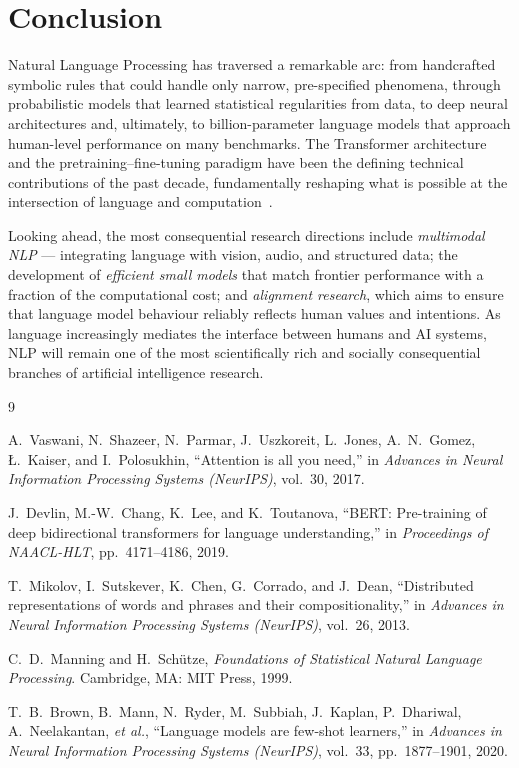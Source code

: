 \documentclass[12pt, a4paper]{article}
\begin{document}
\section{Conclusion}

Natural Language Processing has traversed a remarkable arc: from handcrafted
symbolic rules that could handle only narrow, pre-specified phenomena, through
probabilistic models that learned statistical regularities from data, to deep
neural architectures and, ultimately, to billion-parameter language models that
approach human-level performance on many benchmarks. The Transformer architecture
and the pretraining--fine-tuning paradigm have been the defining technical
contributions of the past decade, fundamentally reshaping what is possible at
the intersection of language and computation~\cite{vaswani2017attention,devlin2018bert}.

Looking ahead, the most consequential research directions include
\textit{multimodal NLP} --- integrating language with vision, audio, and
structured data; the development of \textit{efficient small models} that match
frontier performance with a fraction of the computational cost; and
\textit{alignment research}, which aims to ensure that language model behaviour
reliably reflects human values and intentions. As language increasingly mediates
the interface between humans and AI systems, NLP will remain one of the most
scientifically rich and socially consequential branches of artificial
intelligence research.


\begin{thebibliography}{9}

A.\ Vaswani, N.\ Shazeer, N.\ Parmar, J.\ Uszkoreit, L.\ Jones, A.\ N.\ Gomez,
\L.\ Kaiser, and I.\ Polosukhin,
``Attention is all you need,''
in \textit{Advances in Neural Information Processing Systems (NeurIPS)},
vol.\ 30, 2017.

J.\ Devlin, M.-W.\ Chang, K.\ Lee, and K.\ Toutanova,
``BERT: Pre-training of deep bidirectional transformers for language
understanding,''
in \textit{Proceedings of NAACL-HLT}, pp.\ 4171--4186, 2019.

T.\ Mikolov, I.\ Sutskever, K.\ Chen, G.\ Corrado, and J.\ Dean,
``Distributed representations of words and phrases and their compositionality,''
in \textit{Advances in Neural Information Processing Systems (NeurIPS)},
vol.\ 26, 2013.

C.\ D.\ Manning and H.\ Schütze,
\textit{Foundations of Statistical Natural Language Processing}.
Cambridge, MA: MIT Press, 1999.

T.\ B.\ Brown, B.\ Mann, N.\ Ryder, M.\ Subbiah, J.\ Kaplan, P.\ Dhariwal,
A.\ Neelakantan, \textit{et al.},
``Language models are few-shot learners,''
in \textit{Advances in Neural Information Processing Systems (NeurIPS)},
vol.\ 33, pp.\ 1877--1901, 2020.

\end{thebibliography}
\end{document}
